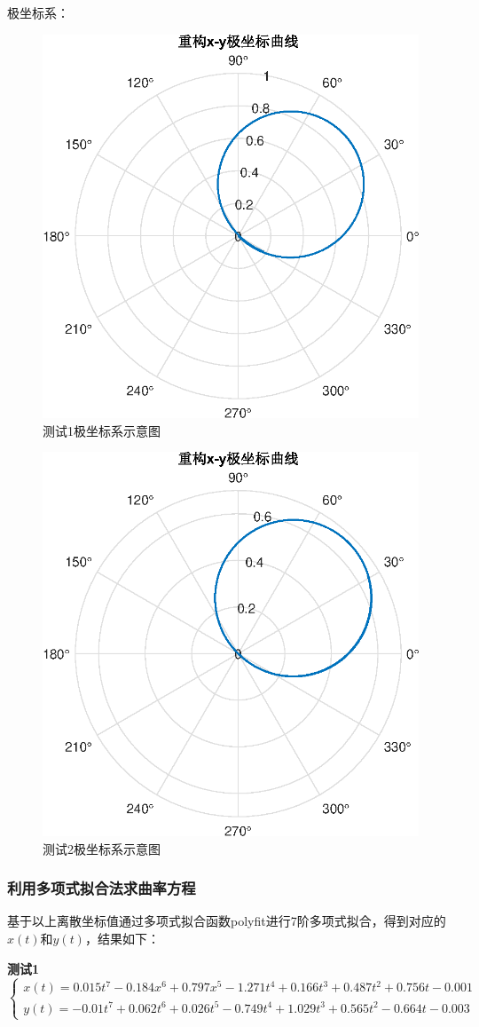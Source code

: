 \documentclass[withoutpreface,bwprint]{cumcmthesis}
\begin{document}
极坐标系：
\begin{figure}[!h]
\centering
\includegraphics[width=.6\textwidth]{1极坐标.eps}
\caption{测试1极坐标系示意图}
\end{figure}

\begin{figure}[!h]
\centering
\includegraphics[width=.6\textwidth]{2极坐标.eps}
\caption{测试2极坐标系示意图}
\end{figure}

\vspace{8cm}

\subsubsection{利用多项式拟合法求曲率方程}
基于以上离散坐标值通过多项式拟合函数polyfit进行7阶多项式拟合，得到对应的$x(t)$和$y(t)$，结果如下：

\textbf{测试1}
\begin{equation}
\left\{\begin{array}{l}
x(t)=0.015 t^7-0.184 x^6+0.797 x^5-1.271 t^4+0.166 t^3+0.487 t^2+0.756 t-0.001 \\
y(t)=-0.01 t^7+0.062 t^6+0.026 t^5-0.749 t^4+1.029 t^3+0.565 t^2-0.664 t-0.003
\end{array}\right.
\end{equation}
\end{document}
